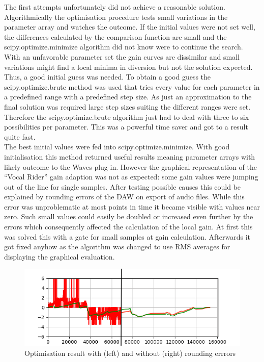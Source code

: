 The first attempts unfortunately did not achieve a reasonable solution. Algorithmically the optimisation procedure tests small variations in the parameter array and watches the outcome. If the initial values were not set well, the differences calculated by the comparison function are small and the scipy.optimize.minimize algorithm did not know were to continue the search. With an unfavorable parameter set the gain curves are dissimilar and small variations might find a local minima in diversion but not the solution expected.\\
Thus, a good initial guess was needed. To obtain a good guess the scipy.optimize.brute method was used that tries every value for each parameter in a predefined range with a predefined step size. As just an approximation to the final solution was required large step sizes suiting the different ranges were set. Therefore the scipy.optimize.brute algorithm just had to deal with three to six possibilities per parameter. This was a powerful time saver and got to a result quite fast.\\
The best initial values were fed into scipy.optimize.minimize. With good initialisation this method returned useful results meaning parameter arrays with likely outcome to the Waves plug-in. However the graphical representation of the “Vocal Rider” gain adaption was not as expected: some gain values were jumping out of the line for single samples. After testing possible causes this could be explained by rounding errors of the DAW on export of audio files. While this error was unproblematic at most points in time it became visible with values near zero. Such small values could easily be doubled or increased even further by the errors which consequently affected the calculation of the local gain. At first this was solved this with a gate for small samples at gain calculation. Afterwards it got fixed anyhow as the algorithm was changed to use RMS averages for displaying the graphical evaluation.\\

\begin{figure}[H]
\includegraphics[width=\textwidth]{images/afterSmooth}
\caption{Optimisation result with (left) and without (right) rounding errrors}
\end{figure}

